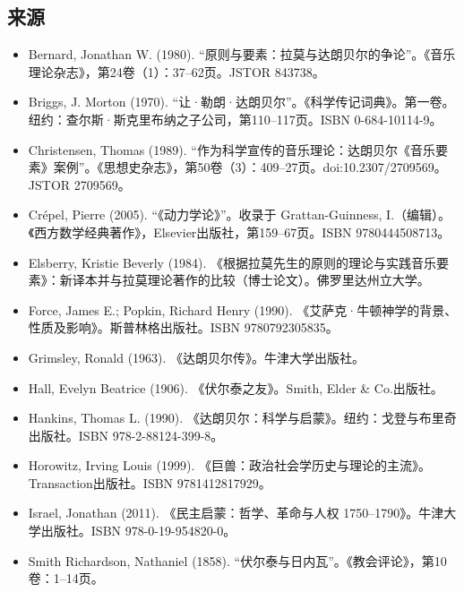 \subsection{来源}
\begin{itemize}
\item Bernard, Jonathan W. (1980). “原则与要素：拉莫与达朗贝尔的争论”。《音乐理论杂志》，第24卷（1）：37–62页。JSTOR 843738。
\item Briggs, J. Morton (1970). “让·勒朗·达朗贝尔”。《科学传记词典》。第一卷。纽约：查尔斯·斯克里布纳之子公司，第110–117页。ISBN 0-684-10114-9。
\item Christensen, Thomas (1989). “作为科学宣传的音乐理论：达朗贝尔《音乐要素》案例”。《思想史杂志》，第50卷（3）：409–27页。doi:10.2307/2709569。JSTOR 2709569。
\item Crépel, Pierre (2005). “《动力学论》”。收录于 Grattan-Guinness, I.（编辑）。《西方数学经典著作》，Elsevier出版社，第159–67页。ISBN 9780444508713。
\item Elsberry, Kristie Beverly (1984). 《根据拉莫先生的原则的理论与实践音乐要素》：新译本并与拉莫理论著作的比较（博士论文）。佛罗里达州立大学。
\item Force, James E.; Popkin, Richard Henry (1990). 《艾萨克·牛顿神学的背景、性质及影响》。斯普林格出版社。ISBN 9780792305835。
\item Grimsley, Ronald (1963). 《达朗贝尔传》。牛津大学出版社。
\item Hall, Evelyn Beatrice (1906). 《伏尔泰之友》。Smith, Elder & Co.出版社。
\item Hankins, Thomas L. (1990). 《达朗贝尔：科学与启蒙》。纽约：戈登与布里奇出版社。ISBN 978-2-88124-399-8。
\item Horowitz, Irving Louis (1999). 《巨兽：政治社会学历史与理论的主流》。Transaction出版社。ISBN 9781412817929。
\item Israel, Jonathan (2011). 《民主启蒙：哲学、革命与人权 1750–1790》。牛津大学出版社。ISBN 978-0-19-954820-0。
\item Smith Richardson, Nathaniel (1858). “伏尔泰与日内瓦”。《教会评论》，第10卷：1–14页。
\end{itemize}
